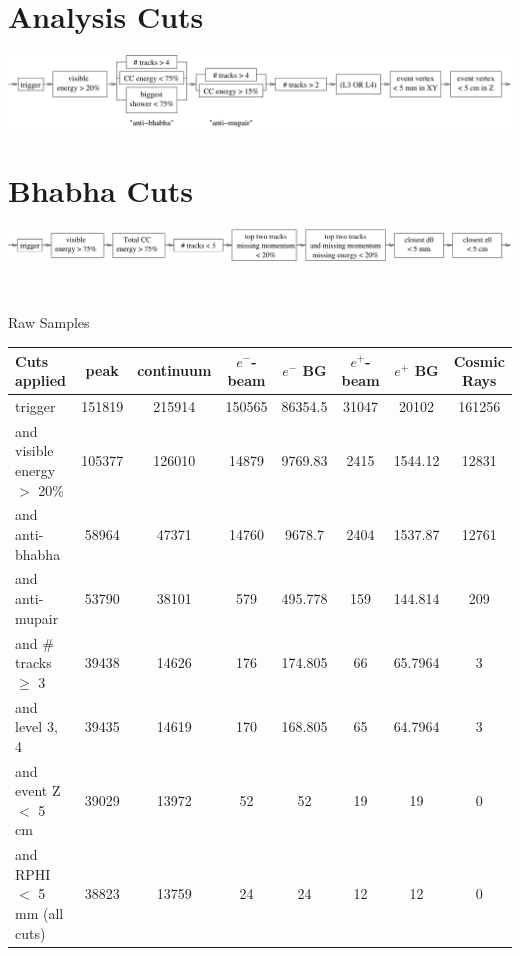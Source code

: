 \documentclass[landscape]{article}
\begin{document}
\pagebreak

\mbox{ }

\vfill

\section*{Analysis Cuts}

\begin{center}
  \includegraphics[width=\linewidth]{analysis_cuts.pdf}
\end{center}

\vfill

\section*{Bhabha Cuts}

\begin{center}
  \includegraphics[width=\linewidth]{bhabha_cuts.pdf}
\end{center}

\vfill

\pagebreak

\mbox{ }

\vfill

\begin{center}
{\sc Raw Samples} \\
\vspace{0.2 cm}

\begin{tabular}{l c c c c c c c}
\hline\hline Cuts applied & peak & continuum & $e^-$-beam & $e^-$ BG & $e^+$-beam & $e^+$ BG & Cosmic Rays \\\hline

 trigger & 151819 & 215914 & 150565 & 86354.5 & 31047 & 20102 & 161256 \\
 {\sc and} visible energy $>$ 20\% & 105377 & 126010 & 14879 & 9769.83 & 2415 & 1544.12 & 12831 \\
 {\sc and} anti-bhabha & 58964 & 47371 & 14760 & 9678.7 & 2404 & 1537.87 & 12761 \\
 {\sc and} anti-mupair & 53790 & 38101 & 579 & 495.778 & 159 & 144.814 & 209 \\
 {\sc and} \# tracks $\ge$ 3 & 39438 & 14626 & 176 & 174.805 & 66 & 65.7964 & 3 \\
 {\sc and} level 3, 4 & 39435 & 14619 & 170 & 168.805 & 65 & 64.7964 & 3 \\
 {\sc and} event Z $<$ 5 cm & 39029 & 13972 & 52 & 52 & 19 & 19 & 0 \\
 {\sc and} RPHI $<$ 5 mm (all cuts) & 38823 & 13759 & 24 & 24 & 12 & 12 & 0 \\\hline\hline

\end{tabular}
\end{center}
\end{document}
